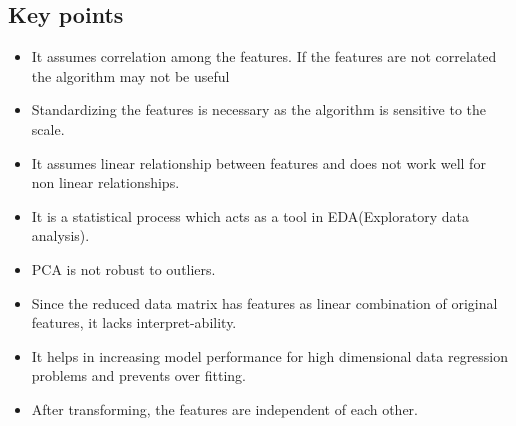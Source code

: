 \documentclass[12pt,letterpaper, onecolumn]{exam}
\begin{document}
\subsection*{Key points}
\begin{itemize}
\item It assumes correlation among the features. If the features are not correlated the algorithm may not be useful
\item Standardizing the features is necessary as the algorithm is sensitive to the scale.
\item It assumes linear relationship between features and does not work well for non linear relationships.
\item It is a statistical process which acts as a tool in EDA(Exploratory data analysis).
\item PCA is not robust to outliers.
\item Since the reduced data matrix has features as linear combination of original features, it lacks interpret-ability.
\item It helps in increasing model performance for high dimensional data regression problems and prevents over fitting.
\item After transforming, the features are independent of each other.
\end{itemize}
\end{document}
